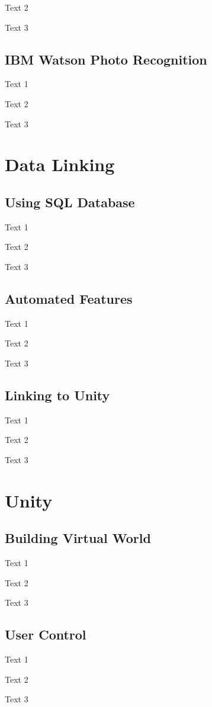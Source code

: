 Text 2

Text 3

\subsection{IBM Watson Photo Recognition}\label{sec:im2.3}
Text 1

Text 2

Text 3

\section{Data Linking}\label{sec:im3}


\subsection{Using SQL Database}\label{sec:im3.1}
Text 1

Text 2

Text 3

\subsection{Automated Features}\label{sec:im3.2}
Text 1

Text 2

Text 3

\subsection{Linking to Unity}\label{sec:im3.3}
Text 1

Text 2

Text 3

\section{Unity}\label{sec:im4}


\subsection{Building Virtual World}\label{sec:im4.1}
Text 1

Text 2

Text 3

\subsection{User Control}\label{sec:im4.2}
Text 1

Text 2

Text 3